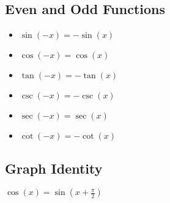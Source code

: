 \subsection{Even and Odd Functions}
\begin{itemize}[label=\(-\)]
    \item \( \sin(-x) = -\sin(x) \)
    \item \( \cos(-x) = \cos(x) \)
    \item \( \tan(-x) = -\tan(x) \)
    \item \( \csc(-x) = -\csc(x) \)
    \item \( \sec(-x) = \sec(x) \)
    \item \( \cot(-x) = -\cot(x) \)
\end{itemize}

\subsection{Graph Identity}
\(\cos(x) = \sin(x + \frac{\pi}{2})\)

